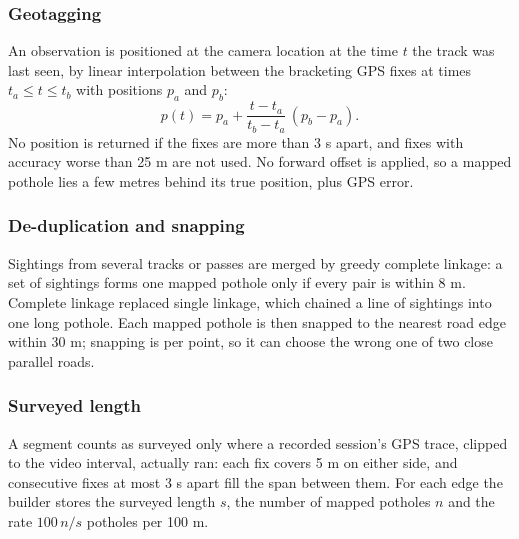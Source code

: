 \subsubsection*{Geotagging}
An observation is positioned at the camera location at the time $t$ the track was last seen, by linear interpolation between the bracketing GPS fixes at times $t_a \le t \le t_b$ with positions $p_a$ and $p_b$:
\begin{equation}
p(t)=p_a+\frac{t-t_a}{t_b-t_a}\,(p_b-p_a).
\label{eq:ch4-interp}
\end{equation}
No position is returned if the fixes are more than 3 s apart, and fixes with accuracy worse than 25 m are not used. No forward offset is applied, so a mapped pothole lies a few metres behind its true position, plus GPS error.

\subsubsection*{De-duplication and snapping}
Sightings from several tracks or passes are merged by greedy complete linkage: a set of sightings forms one mapped pothole only if every pair is within 8 m. Complete linkage replaced single linkage, which chained a line of sightings into one long pothole. Each mapped pothole is then snapped to the nearest road edge within 30 m; snapping is per point, so it can choose the wrong one of two close parallel roads.

\subsubsection*{Surveyed length}
A segment counts as surveyed only where a recorded session's GPS trace, clipped to the video interval, actually ran: each fix covers 5 m on either side, and consecutive fixes at most 3 s apart fill the span between them. For each edge the builder stores the surveyed length $s$, the number of mapped potholes $n$ and the rate $100\,n/s$ potholes per 100 m.

